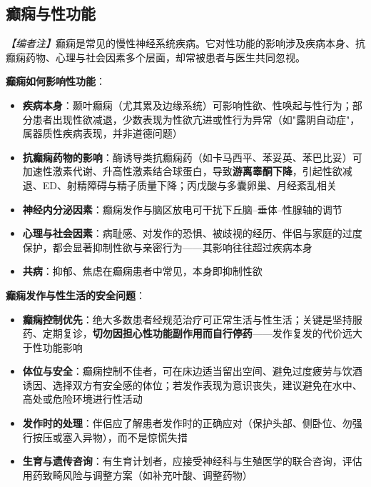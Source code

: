 \subsection{癫痫与性功能}
\label{subsec:epilepsy_sex}

\noindent\textit{【编者注】}癫痫是常见的慢性神经系统疾病。它对性功能的影响涉及疾病本身、抗癫痫药物、心理与社会因素多个层面，却常被患者与医生共同忽视。

\vspace{0.5em}
\noindent\textbf{癫痫如何影响性功能}：

\begin{itemize}
	\item \textbf{疾病本身}：颞叶癫痫（尤其累及边缘系统）可影响性欲、性唤起与性行为；部分患者出现性欲减退，少数表现为性欲亢进或性行为异常（如"露阴自动症"，属器质性疾病表现，并非道德问题）
	\item \textbf{抗癫痫药物的影响}：酶诱导类抗癫痫药（如卡马西平、苯妥英、苯巴比妥）可加速性激素代谢、升高性激素结合球蛋白，导致\textbf{游离睾酮下降}，引起性欲减退、ED、射精障碍与精子质量下降；丙戊酸与多囊卵巢、月经紊乱相关
	\item \textbf{神经内分泌因素}：癫痫发作与脑区放电可干扰下丘脑--垂体--性腺轴的调节
	\item \textbf{心理与社会因素}：病耻感、对发作的恐惧、被歧视的经历、伴侣与家庭的过度保护，都会显著抑制性欲与亲密行为——其影响往往超过疾病本身
	\item \textbf{共病}：抑郁、焦虑在癫痫患者中常见，本身即抑制性欲
\end{itemize}

\vspace{0.5em}
\noindent\textbf{癫痫发作与性生活的安全问题}：

\begin{itemize}
	\item \textbf{癫痫控制优先}：绝大多数患者经规范治疗可正常生活与性生活；关键是坚持服药、定期复诊，\textbf{切勿因担心性功能副作用而自行停药}——发作复发的代价远大于性功能影响
	\item \textbf{体位与安全}：癫痫控制不佳者，可在床边适当留出空间、避免过度疲劳与饮酒诱因、选择双方有安全感的体位；若发作表现为意识丧失，建议避免在水中、高处或危险环境进行性活动
	\item \textbf{发作时的处理}：伴侣应了解患者发作时的正确应对（保护头部、侧卧位、勿强行按压或塞入异物），而不是惊慌失措
	\item \textbf{生育与遗传咨询}：有生育计划者，应接受神经科与生殖医学的联合咨询，评估用药致畸风险与调整方案（如补充叶酸、调整药物）
\end{itemize}

